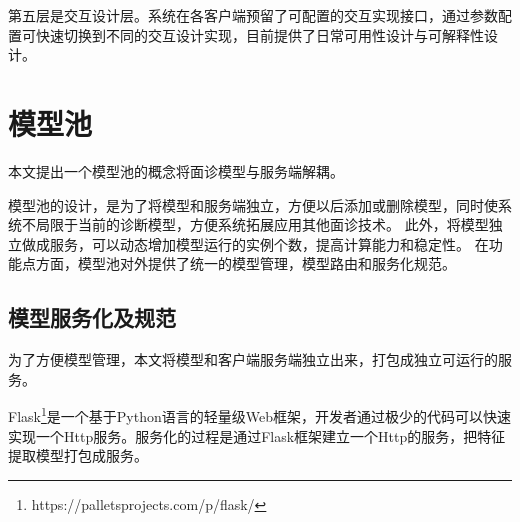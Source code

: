 第五层是交互设计层。系统在各客户端预留了可配置的交互实现接口，通过参数配置可快速切换到不同的交互设计实现，目前提供了日常可用性设计与可解释性设计。


%

\section{模型池}
\label{sec:model_pool}
本文提出一个模型池的概念将面诊模型与服务端解耦。

模型池的设计，是为了将模型和服务端独立，方便以后添加或删除模型，同时使系统不局限于当前的诊断模型，方便系统拓展应用其他面诊技术。
此外，将模型独立做成服务，可以动态增加模型运行的实例个数，提高计算能力和稳定性。
在功能点方面，模型池对外提供了统一的模型管理，模型路由和服务化规范。

\subsection{模型服务化及规范}
为了方便模型管理，本文将模型和客户端服务端独立出来，打包成独立可运行的服务。

Flask\footnote{https://palletsprojects.com/p/flask/}是一个基于Python语言的轻量级Web框架，开发者通过极少的代码可以快速实现一个Http服务。服务化的过程是通过Flask框架建立一个Http的服务，把特征提取模型打包成服务。

